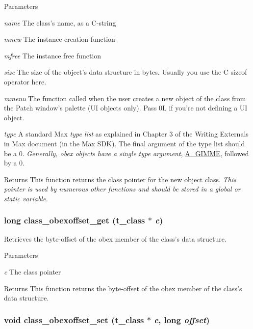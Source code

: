 \begin{DoxyParams}{Parameters}
\item[{\em name}]The class's name, as a C-\/string \item[{\em mnew}]The instance creation function \item[{\em mfree}]The instance free function \item[{\em size}]The size of the object's data structure in bytes. Usually you use the C sizeof operator here. \item[{\em mmenu}]The function called when the user creates a new object of the class from the Patch window's palette (UI objects only). Pass 0L if you're not defining a UI object. \item[{\em type}]A standard Max {\itshape type list\/} as explained in Chapter 3 of the Writing Externals in Max document (in the Max SDK). The final argument of the type list should be a 0. {\itshape Generally, obex objects have a single type argument\/}, \hyperlink{group__atom_gga8aa6700e9f00b132eb376db6e39ade47a81c1a8550f038db16a619167a70a79b6}{A\_\-GIMME}, followed by a 0.\end{DoxyParams}
\begin{DoxyReturn}{Returns}
This function returns the class pointer for the new object class. {\itshape This pointer is used by numerous other functions and should be stored in a global or static variable.\/} 
\end{DoxyReturn}
\hypertarget{group__class_ga237b86f879e3eb3edbf674ffccc1f97c}{
\subsubsection[{class\_\-obexoffset\_\-get}]{\setlength{\rightskip}{0pt plus 5cm}long class\_\-obexoffset\_\-get ({\bf t\_\-class} $\ast$ {\em c})}}
\label{group__class_ga237b86f879e3eb3edbf674ffccc1f97c}


Retrieves the byte-\/offset of the obex member of the class's data structure. 
\begin{DoxyParams}{Parameters}
\item[{\em c}]The class pointer \end{DoxyParams}
\begin{DoxyReturn}{Returns}
This function returns the byte-\/offset of the obex member of the class's data structure. 
\end{DoxyReturn}
\hypertarget{group__class_ga55ca4872991242c991b8bf6adb9bf6a6}{
\subsubsection[{class\_\-obexoffset\_\-set}]{\setlength{\rightskip}{0pt plus 5cm}void class\_\-obexoffset\_\-set ({\bf t\_\-class} $\ast$ {\em c}, \/  long {\em offset})}}
\label{group__class_ga55ca4872991242c991b8bf6adb9bf6a6}


